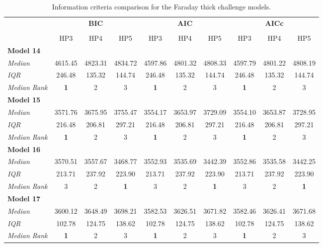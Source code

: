\documentclass[fleqn,usenatbib]{mnras}
\begin{document}
\begin{table}
\caption{Information criteria comparison for the \protect\cite{Sun_2015} Faraday thick challenge models.}
    \centering
    \begin{tabular}{@{\extracolsep{3pt}}lccccccccc@{}}
    \hline
     & \multicolumn{3}{c}{\textbf{BIC}} & \multicolumn{3}{c}{\textbf{AIC}} & \multicolumn{3}{c}{\textbf{AICc}} \\
     \cline{2-4} \cline{5-7} \cline{8-10} \\
     & HP3 & HP4 & HP5 & HP3 & HP4 & HP5 & HP3 & HP4 & HP5 \\\hline
    \textbf{Model 14} & & & & & & & & & \\
    \emph{Median} & 4615.45 & 4823.31 & 4834.72 & 4597.86 & 4801.32 & 4808.33 & 4597.79 & 4801.22 & 4808.19 \\
    \emph{IQR} & 246.48 & 135.32 & 144.74 & 246.48 & 135.32 & 144.74 & 246.48 & 135.32 & 144.74 \\
    \emph{Median Rank} & \textbf{1} & 2  & 3 & \textbf{1} & 2  & 3 & \textbf{1} & 2  & 3 \\\hline
    \textbf{Model 15} & & & & & & & & & \\
    \emph{Median} & 3571.76 & 3675.95 & 3755.47 & 3554.17 & 3653.97 & 3729.09 & 3554.10 & 3653.87 & 3728.95 \\
    \emph{IQR} & 216.48 & 206.81 & 297.21 & 216.48 & 206.81 & 297.21 & 216.48 & 206.81 & 297.21 \\
    \emph{Median Rank} & \textbf{1} & 2 & 3 & \textbf{1} & 2 & 3 & \textbf{1} & 2 & 3 \\\hline
    \textbf{Model 16} & & & & & & & & & \\
    \emph{Median} & 3570.51 & 3557.67 & 3468.77 & 3552.93 & 3535.69 & 3442.39 & 3552.86 & 3535.58 & 3442.25 \\
    \emph{IQR} & 213.71 & 237.92 & 223.90 & 213.71 & 237.92 & 223.90 & 213.71 & 237.92 & 223.90 \\
    \emph{Median Rank} & 3 & 2 & \textbf{1} & 3 & 2 & \textbf{1} & 3 & 2 & \textbf{1} \\\hline
    \textbf{Model 17} & & & & & & & & & \\
    \emph{Median} & 3600.12 & 3648.49 & 3698.21 & 3582.53 & 3626.51 & 3671.82 & 3582.46 & 3626.41 & 3671.68 \\
    \emph{IQR} & 102.78 & 124.75 & 138.62 & 102.78 & 124.75 & 138.62 & 102.78 & 124.75 & 138.62 \\
    \emph{Median Rank} & \textbf{1} & 2 & 3 & \textbf{1} & 2 & 3 & \textbf{1} & 2 & 3 \\\hline
    \end{tabular}
  \label{tab:icthick}
\end{table}






\bsp	%
\label{lastpage}
\end{document}
